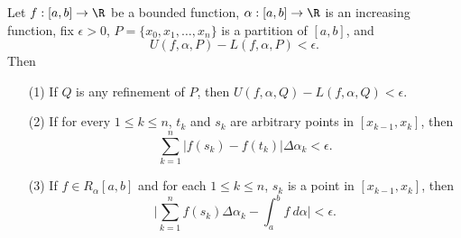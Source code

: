 \begin{theorem}[Rudin 6.7]\label{Rudin 6.7}
    Let \( f:[a,b] \to \R  \) be a bounded function, \( \alpha:[a,b] \to \R  \) is an increasing function, fix \( \epsilon > 0  \), \( P = \{ {x}_{0}, {x}_{1}, \dots, {x}_{n} \}  \) is a partition of \( [a,b] \), and 
    \[  U(f,\alpha, P) - L(f,\alpha, P) < \epsilon. \]
    Then
    \begin{enumerate}
        \item[(1)] If \( Q  \) is any refinement of \( P  \), then \( U(f,\alpha, Q ) - L(f,\alpha, Q ) < \epsilon \).
        \item[(2)] If for every \( 1 \leq k \leq n  \), \( {t}_{k } \) and \( {s}_{k } \) are arbitrary points in \( [{x}_{k-1}, {x}_{k}] \), then
            \[  \sum_{ k=1  }^{ n } | f({s}_{k}) - f({t}_{k}) | \Delta {\alpha}_{k } < \epsilon. \]
        \item[(3)] If \( f \in {R}_{\alpha}[a,b] \) and for each \( 1 \leq k \leq n  \), \( {s}_{k} \) is a point in \( [{x}_{k-1}, {x}_{k}] \), then
            \[  \Big| \sum_{ k=1  }^{ n } f({s}_{k}) \Delta {\alpha}_{k } - \int_{ a }^{ b } f \ d \alpha \Big|  < \epsilon. \]
    \end{enumerate}
\end{theorem} 
